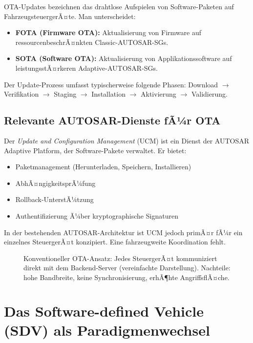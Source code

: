 ﻿\documentclass[12pt,a4paper,twoside]{article}
\begin{document}
OTA-Updates bezeichnen das drahtlose Aufspielen von Software-Paketen auf
FahrzeugsteuergerÃ¤te. Man unterscheidet:

\begin{itemize}
  \item \textbf{FOTA (Firmware OTA):} Aktualisierung von Firmware auf
    ressourcenbeschrÃ¤nkten Classic-AUTOSAR-SGs.
  \item \textbf{SOTA (Software OTA):} Aktualisierung von Applikationssoftware
    auf leistungsstÃ¤rkeren Adaptive-AUTOSAR-SGs.
\end{itemize}

Der Update-Prozess umfasst typischerweise folgende Phasen:
Download $\rightarrow$ Verifikation $\rightarrow$ Staging $\rightarrow$
Installation $\rightarrow$ Aktivierung $\rightarrow$ Validierung.

\subsection{Relevante AUTOSAR-Dienste fÃ¼r OTA}

Der \textit{Update and Configuration Management} (UCM) ist ein Dienst der
AUTOSAR Adaptive Platform, der Software-Pakete verwaltet. Er bietet:
\begin{itemize}
  \item Paketmanagement (Herunterladen, Speichern, Installieren)
  \item AbhÃ¤ngigkeitsprÃ¼fung
  \item Rollback-UnterstÃ¼tzung
  \item Authentifizierung Ã¼ber kryptographische Signaturen
\end{itemize}

In der bestehenden AUTOSAR-Architektur ist UCM jedoch primÃ¤r fÃ¼r ein
einzelnes SteuergerÃ¤t konzipiert. Eine fahrzeugweite Koordination fehlt.

\begin{figure}[h!]
  \centering
  
  \caption{Konventioneller OTA-Ansatz: Jedes SteuergerÃ¤t kommuniziert
    direkt mit dem Backend-Server (vereinfachte Darstellung).
    Nachteile: hohe Bandbreite, keine Synchronisierung, erhÃ¶hte AngriffsflÃ¤che.}
  \label{fig:ota_current}
\end{figure}




\section{Das Software-defined Vehicle (SDV) als Paradigmenwechsel}
\label{sec:sdv}
\end{document}
